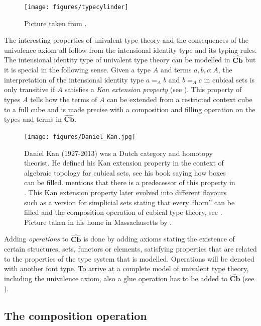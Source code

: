 \documentclass[12pt,a4paper,twoside,xetex]{book} %
\newcommand{\keyword}[1]{\emph{#1}\index{#1}}
\newcommand{\psh}[1]{\widehat{#1}}
\newcommand{\cube}[0]{\textbf{Cb}}
\begin{document}
\begin{figure}\label{hubtypes}
 \centering
 \texttt{[image: figures/typecylinder]}
 \caption{Picture taken from \cite{Huber2016def}.}
\end{figure}

The interesting properties of univalent type theory and the 
consequences of the univalence axiom all follow from the intensional identity 
type and its typing rules. The intensional identity type of univalent type 
theory can be modelled in $\psh{\cube}$ but it is special in the following 
sense. Given a type $A$ and terms $a,b,c:A$, the interpretation of the 
intensional identity type $a =_A b$ and $b=_A c$  in cubical sets is only 
transitive if $A$ satisfies a \keyword{Kan extension property} (see 
). This property of types $A$ tells how the terms of $A$ can be 
extended from a restricted context cube to a full cube and is made precise with a composition and filling operation on the types and terms in $\psh{\cube}$.

\begin{figure}
\begin{centering}
\texttt{[image: figures/Daniel\_Kan.jpg]}
\par\end{centering}
\caption{\label{fig:Kan}Daniel Kan (1927-2013) was a Dutch category and homotopy theorist. He defined his Kan extension property  in the context of algebraic topology for cubical sets, see his book \cite{Kan1955} saying how boxes can be filled. \cite{Coquand2019} mentions that there is a predecessor of this property in \cite{Eilenberg1939}. This Kan extension property later evolved into different flavours such as a version for simplicial sets stating that every ``horn'' can be filled and the composition operation of cubical type theory, see . Picture taken in his home in 
Massachusetts by \cite{Kan2005}.}
\end{figure}

Adding \keyword{operations} to $\psh{\cube}$ is done by adding axioms stating 
the existence of certain structures, sets, functors or elements, satisfying 
properties that are related to the properties of the type system that is 
modelled. Operations will be denoted with another font type. To arrive at a 
complete model of univalent type theory, including the univalence axiom, also a 
glue operation has to be added to $\psh{\cube}$ (see ). 

\subsection{The composition operation}
\end{document}
